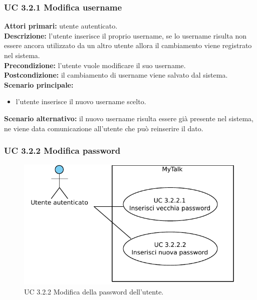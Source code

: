 \subsubsection{UC 3.2.1 Modifica username}

\noindent
\textbf{Attori primari:} utente autenticato.\\
\textbf{Descrizione:} l'utente inserisce il proprio username, se lo username risulta non essere ancora utilizzato da un altro utente allora il cambiamento viene registrato nel sistema.\\
\textbf{Precondizione:} l'utente vuole modificare il suo username.\\
\textbf{Postcondizione:} il cambiamento di username viene salvato dal sistema.\\
\textbf{Scenario principale:}
\begin{itemize}
\item l'utente inserisce il nuovo username scelto.
\end{itemize}
\textbf{Scenario alternativo:} il nuovo username risulta essere già presente nel sistema, ne viene data comunicazione all'utente che può reinserire il dato.

\newpage

\subsubsection{UC 3.2.2 Modifica password}

\begin{figure}[htbp]
\centering
\includegraphics[scale=0.7]{./casi_uso/UC3-2-2.pdf}
\caption{UC 3.2.2 Modifica della password dell'utente.}
\end{figure}

